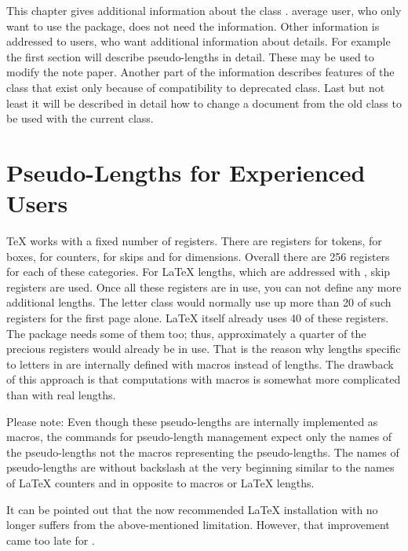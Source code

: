 This chapter gives additional information about the \KOMAScript{} class
.  average user, who only want to use the package,
does not need the information. Other information is addressed to users, who
want additional information about details. For example the first section will
describe pseudo-lengths in detail. These may be used to modify the note paper.
Another part of the information describes features of the class that exist
only because of compatibility to deprecated  class. Last but
not least it will be described in detail how to change a document from the old
 class to be used with the current  class.


\section{Pseudo-Lengths for Experienced Users}
\label{sec:scrlttr2-experts.pseudoLengths}

{\TeX} works with a fixed number of registers. There are registers for tokens,
for boxes, for counters, for skips and for dimensions.  Overall there are 256
registers for each of these categories. For {\LaTeX} lengths, which are
addressed with , skip registers are used. Once all these
registers are in use, you can not define any more additional lengths.  The
letter class  would normally use up more than 20 of such
registers for the first page alone. {\LaTeX} itself already uses 40 of these
registers. The  package needs some of them too; thus,
approximately a quarter of the precious registers would already be in
use. That is the reason why lengths specific to letters in 
are internally defined with macros instead of lengths. The drawback of this
approach is that computations with macros is somewhat more complicated than
with real lengths.

Please note: Even though these pseudo-lengths are
internally implemented as macros, the commands for pseudo-length management
expect only the names of the pseudo-lengths not the macros representing the
pseudo-lengths. The names of pseudo-lengths are without backslash at the very
beginning similar to the names of \LaTeX{} counters and in opposite to macros
or \LaTeX{} lengths.

It can be pointed out that the now recommended {\LaTeX} installation with
{\eTeX} no longer suffers from the above-mentioned limitation. However, that
improvement came too late for .

